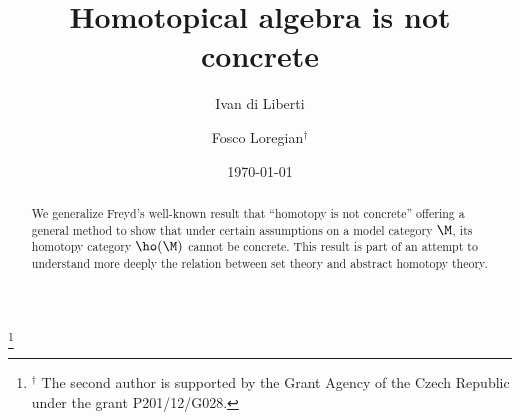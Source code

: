\title{Homotopical algebra is not concrete}

\author{Ivan di Liberti}
\author{Fosco Loregian$^\dag$}
\thanks{$^\dag$ The second author is supported by the Grant Agency of the Czech Republic under the grant \textsc{P}201/12/\textsc{G}028.}
\address{
$^\dag$Department of Mathematics and Statistics\newline
Masaryk University, Faculty of Sciences\newline
Kotl\'{a}\v{r}sk\'{a} 2, 611 37 Brno, Czech Republic\newline
\href{mailto:diliberti@math.muni.cz}{\sf diliberti@math.muni.cz}\newline
\href{mailto:loregianf@math.muni.cz}{\sf loregianf@math.muni.cz}
}

\date{\today}
\maketitle 

\begin{abstract}
We generalize Freyd's well-known result that ``homotopy is not concrete''
offering a general method to show that under certain assumptions on a model
category $\M$, its homotopy category $\ho(\M)$ cannot be concrete. %
This result is part of an attempt to understand more deeply the relation between 
set theory and abstract homotopy theory.
\end{abstract}